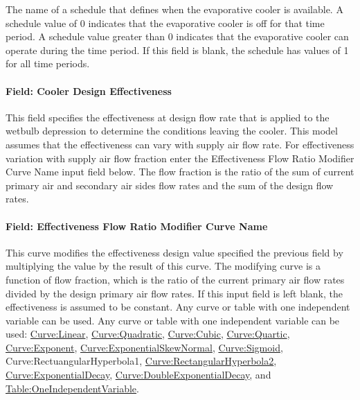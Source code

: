 The name of a schedule that defines when the evaporative cooler is available. A schedule value of 0 indicates that the evaporative cooler is off for that time period. A schedule value greater than 0 indicates that the evaporative cooler can operate during the time period. If this field is blank, the schedule has values of 1 for all time periods.

\paragraph{Field: Cooler Design Effectiveness}\label{field-cooler-design-effectiveness}

This field specifies the effectiveness at design flow rate that is applied to the wetbulb depression to determine the conditions leaving the cooler. This model assumes that the effectiveness can vary with supply air flow rate. For effectiveness variation with supply air flow fraction enter the Effectiveness Flow Ratio Modifier Curve Name input field below. The flow fraction is the ratio of the sum of current primary air and secondary air sides flow rates and the sum of the design flow rates.

\paragraph{Field: Effectiveness Flow Ratio Modifier Curve Name}\label{field-effectiveness-flow-ratio-modifier-curve-name}

This curve modifies the effectiveness design value specified the previous field by multiplying the value by the result of this curve. The modifying curve is a function of flow fraction, which is the ratio of the current primary air flow rates divided by the design primary air flow rates. If this input field is left blank, the effectiveness is assumed to be constant. Any curve or table with one independent variable can be used. Any curve or table with one independent variable can be used: \hyperref[curvelinear]{Curve:Linear}, \hyperref[curvequadratic]{Curve:Quadratic}, \hyperref[curvecubic]{Curve:Cubic}, \hyperref[curvequartic]{Curve:Quartic}, \hyperref[curveexponent]{Curve:Exponent}, \hyperref[curveexponentialskewnormal]{Curve:ExponentialSkewNormal}, \hyperref[curvesigmoid]{Curve:Sigmoid}, Curve:RectuangularHyperbola1, \hyperref[curverectangularhyperbola2]{Curve:RectangularHyperbola2}, \hyperref[curveexponentialdecay]{Curve:ExponentialDecay}, \hyperref[curvedoubleexponentialdecay]{Curve:DoubleExponentialDecay}, and \hyperref[tableoneindependentvariable]{Table:OneIndependentVariable}.

